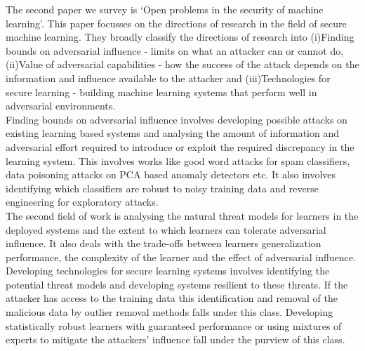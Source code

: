 \documentclass[11pt]{article}
\begin{document}
The second paper we survey is `Open problems in the security of machine learning'. This paper focusses on the directions of research in the field of secure machine learning. They broadly classify the directions of research into (i)Finding bounds on adversarial influence - limits on what an attacker can or cannot do, (ii)Value of adversarial capabilities - how the success of the attack depends on the information and influence available to the attacker and (iii)Technologies for secure learning - building machine learning systems that perform well in adversarial environments.\\ Finding bounds on adversarial influence involves developing possible attacks on existing learning based systems and analysing the amount of information and adversarial effort required to introduce or exploit the required discrepancy in the learning system. This involves works like good word attacks for spam classifiers, data poisoning attacks on PCA based anomaly detectors etc. It also involves identifying which classifiers are robust to noisy training data and reverse engineering for exploratory attacks. \\ The second field of work is analysing the natural threat models for learners in the deployed systems and the extent to which learners can tolerate adversarial influence. It also deals with the trade-offs between learners generalization performance, the complexity of the learner and the effect of adversarial influence. \\ Developing technologies for secure learning systems involves identifying the potential threat models and developing systems resilient to these threats. If the attacker has access to the training data this identification and removal of the malicious data by outlier removal methods falls under this class. Developing statistically robust learners with guaranteed performance or using mixtures of experts to mitigate the attackers' influence fall under the purview of this class. \\ \\
\end{document}
